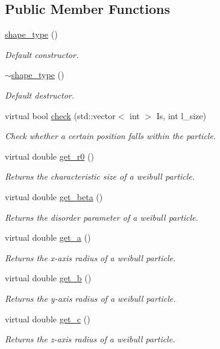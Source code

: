 \subsection*{Public Member Functions}
\begin{DoxyCompactItemize}
\item 
\hyperlink{classshape__type_a166412643048108f9d26fff1aa4078c0}{shape\+\_\+type} ()
\begin{DoxyCompactList}\small\item\em Default constructor. \end{DoxyCompactList}\item 
\hyperlink{classshape__type_a409407285e724c1956488a9c807ac2ca}{$\sim$shape\+\_\+type} ()
\begin{DoxyCompactList}\small\item\em Default destructor. \end{DoxyCompactList}\item 
virtual bool \hyperlink{classshape__type_a69a17f14890bf130c990d2d54ddf6f86}{check} (std\+::vector$<$ int $>$ Is, int l\+\_\+size)
\begin{DoxyCompactList}\small\item\em Check whether a certain position falls within the particle. \end{DoxyCompactList}\item 
virtual double \hyperlink{classshape__type_af0fc24250d5cb5cbc4881caffee31371}{get\+\_\+r0} ()
\begin{DoxyCompactList}\small\item\em Returns the characteristic size of a weibull particle. \end{DoxyCompactList}\item 
virtual double \hyperlink{classshape__type_ad04d2331bc8bcd8504719fec8e852f32}{get\+\_\+beta} ()
\begin{DoxyCompactList}\small\item\em Returns the disorder parameter of a weibull particle. \end{DoxyCompactList}\item 
virtual double \hyperlink{classshape__type_a68e467cf7ec75b436f0d0054d824766d}{get\+\_\+a} ()
\begin{DoxyCompactList}\small\item\em Returns the x-\/axis radius of a weibull particle. \end{DoxyCompactList}\item 
virtual double \hyperlink{classshape__type_a4db290d08ad12bf153d6f8ffdc4d44af}{get\+\_\+b} ()
\begin{DoxyCompactList}\small\item\em Returns the y-\/axis radius of a weibull particle. \end{DoxyCompactList}\item 
virtual double \hyperlink{classshape__type_a5ab8305b100bc3bba1ae4c14bd8257da}{get\+\_\+c} ()
\begin{DoxyCompactList}\small\item\em Returns the z-\/axis radius of a weibull particle. \end{DoxyCompactList}\end{DoxyCompactItemize}



